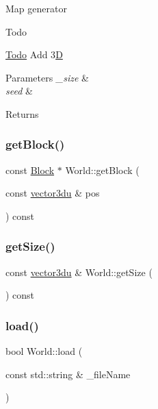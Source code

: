Map generator \begin{DoxyRefDesc}{Todo}
\item[\mbox{\hyperlink{todo__todo000005}{Todo}}]Add 3\mbox{\hyperlink{namespace_d}{D}} \end{DoxyRefDesc}

\begin{DoxyParams}{Parameters}
{\em \+\_\+size} & \\
\hline
{\em seed} & \\
\hline
\end{DoxyParams}
\begin{DoxyReturn}{Returns}

\end{DoxyReturn}
\mbox{\label{class_world_ad9c5dd128373fd90b8e644355f64ae5a}} 
\subsubsection{\texorpdfstring{getBlock()}{getBlock()}}
{\footnotesize\ttfamily const \mbox{\hyperlink{class_block}{Block}} $\ast$ World\+::get\+Block (\begin{DoxyParamCaption}\item[{const \mbox{\hyperlink{_utility_8hpp_ac675fa2b6c79d0be47ae76e5d0ce38a8}{vector3du}} \&}]{pos }\end{DoxyParamCaption}) const}

\mbox{\label{class_world_a967df6dfad453fec941be8df521dca15}} 
\subsubsection{\texorpdfstring{getSize()}{getSize()}}
{\footnotesize\ttfamily const \mbox{\hyperlink{_utility_8hpp_ac675fa2b6c79d0be47ae76e5d0ce38a8}{vector3du}} \& World\+::get\+Size (\begin{DoxyParamCaption}{ }\end{DoxyParamCaption}) const}

\mbox{\label{class_world_ac9eb168d9faee4243edbee43b8a769bb}} 
\subsubsection{\texorpdfstring{load()}{load()}}
{\footnotesize\ttfamily bool World\+::load (\begin{DoxyParamCaption}\item[{const std\+::string \&}]{\+\_\+file\+Name }\end{DoxyParamCaption})}

